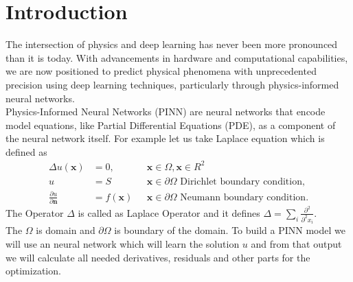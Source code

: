 \chapter{Introduction}
The intersection of physics and deep learning has never been more pronounced than it is today. With advancements in hardware and computational capabilities, we are now positioned to predict physical phenomena with unprecedented precision using deep learning techniques, particularly through physics-informed neural networks.\\
Physics-Informed Neural Networks (PINN) are neural networks  that encode model equations, like Partial Differential Equations (PDE), as a component of the neural network itself\cite{Cuomo2022}. For example let us take Laplace equation which is defined as
\begin{eqnarray}
	\Delta u(\mathbf{x}) &= 0, &\texttt{   }\mathbf{x}\in \Omega,\mathbf{x}\in R^2\\
	u &= S &\texttt{   }\mathbf{x}\in \partial\Omega \text{     Dirichlet boundary condition},\\
	\frac{\partial u}{\partial \mathbf{n}} &= f(\mathbf{x}) &\texttt{   }\mathbf{x}\in \partial\Omega \text{     Neumann boundary condition}.
\end{eqnarray}
The Operator $\Delta$ is called as Laplace Operator and it defines $\Delta = \sum_i \frac{\partial^2}{\partial^2 x_i}.$\\
The $\Omega$ is domain and $\partial \Omega$ is boundary of the domain. 
To build a PINN model we will use an neural network which will learn the solution $u$ and from that output we will calculate all needed derivatives, residuals and other parts for the optimization.

